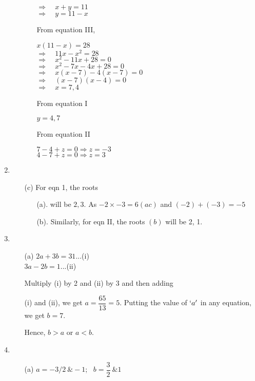 \begin{multicols}{2}
\begin{enumerate}
\begin{itemize}
\begin{itemize}
      $\Rightarrow\quad x + y = 11$\\
      $\Rightarrow\quad y = 11 - x$

      From equation III,

      $x (11 - x) = 28$\\
      $\Rightarrow\quad 11x - x^2 = 28$\\
      $\Rightarrow\quad x^2 - 11x + 28 = 0$\\
      $\Rightarrow\quad x^2 - 7x - 4x + 28 = 0$\\
      $\Rightarrow\quad x(x - 7) -4 (x - 7) = 0$\\
      $\Rightarrow\quad (x - 7) (x - 4) = 0$\\
      $\Rightarrow\quad x = 7, 4$

      From equation I

      $y = 4, 7$

      From equation II

      $7 - 4 + z = 0 \Rightarrow z = -3$\\
      $4 - 7 + z = 0 \Rightarrow z = 3$
      \end{itemize}
  \end{itemize}
\item
  \begin{itemize}
  \item[(c)] For eqn 1, the roots
    \begin{itemize}
    \item[(a).] will be $2, 3$. As $-2 \times -3 = 6 (ac)$ and $(-2) + (-3) = -5$
    \item[(b).] Similarly, for eqn II, the roots $(b)$ will be 2, 1. 
      \end{itemize}
  \end{itemize}
\item
  \begin{itemize}
  \item[(a)] $2a + 3b = 31$\quad ...(i)\\
    $3a - 2b = 1$\quad ...(ii)

    Multiply (i) by 2 and (ii) by 3 and then adding

    (i) and (ii), we get $a = \dfrac{65}{13} = 5$. Putting the value of $`a'$ in any equation, we get $b = 7$.

    Hence, $b > a$ or $a < b$.
  \end{itemize}
\item
  \begin{itemize}
\item[(a)] $a = -3/2\ \& -1$;~ $b = \dfrac{3}{2}\ \& 1$
  \end{itemize}


\end{enumerate}
\end{multicols}
